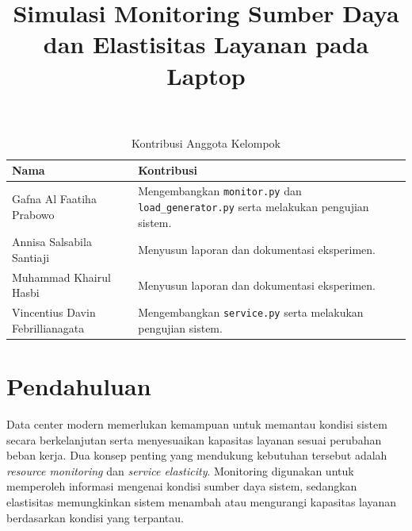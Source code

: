 \documentclass[conference]{IEEEtran}
\begin{document}
\title{Simulasi Monitoring Sumber Daya dan Elastisitas Layanan pada Laptop}

\author{
}

\maketitle

\begin{table}[h]
\centering
\caption{Kontribusi Anggota Kelompok}
\label{tab:kontribusi}
\small
\begin{tabular}{|p{3.5cm}|p{3.5cm}|}
\hline
\textbf{Nama} & \textbf{Kontribusi} \\
\hline
Gafna Al Faatiha Prabowo &
Mengembangkan \texttt{monitor.py} dan \texttt{load\_generator.py} serta melakukan pengujian sistem. \\
\hline

Annisa Salsabila Santiaji &
Menyusun laporan dan dokumentasi eksperimen. \\
\hline

Muhammad Khairul Hasbi &
Menyusun laporan dan dokumentasi eksperimen. \\
\hline

Vincentius Davin Febrillianagata &
Mengembangkan \texttt{service.py} serta melakukan pengujian sistem. \\
\hline
\end{tabular}
\end{table}

\section{Pendahuluan}
Data center modern memerlukan kemampuan untuk memantau kondisi sistem secara berkelanjutan serta menyesuaikan kapasitas layanan sesuai perubahan beban kerja. Dua konsep penting yang mendukung kebutuhan tersebut adalah \textit{resource monitoring} dan \textit{service elasticity}. Monitoring digunakan untuk memperoleh informasi mengenai kondisi sumber daya sistem, sedangkan elastisitas memungkinkan sistem menambah atau mengurangi kapasitas layanan berdasarkan kondisi yang terpantau.
\end{document}
